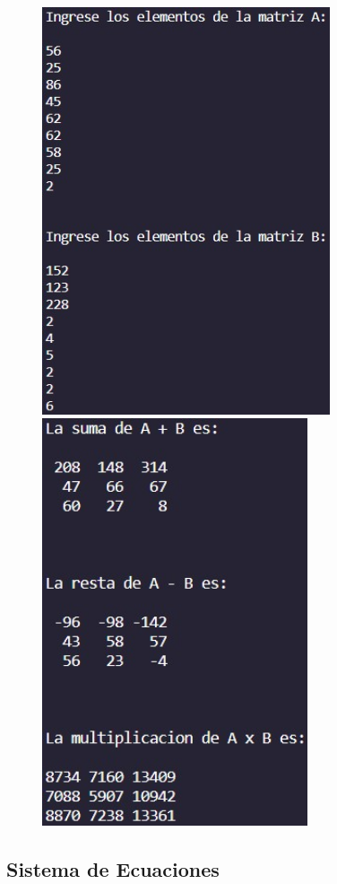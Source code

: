 \documentclass{article}
\begin{document}
\begin{figure}[H]
	\centering
	\includegraphics[height = 12cm]{img2a.jpg}
	\includegraphics[height = 12cm]{img2b.jpg}
\end{figure}

\subsection{Sistema de Ecuaciones}
\end{document}
